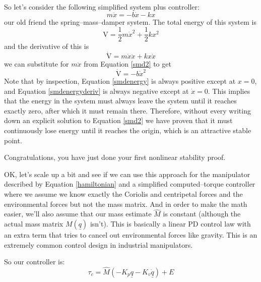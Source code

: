 \documentclass[]{article}
\begin{document}
So let's consider the following simplified system plus controller:
\begin{equation}
 m\ddot{x} = -b\dot{x} - kx \label{smd2}
\end{equation}
our old friend the spring--mass--damper system.
The total energy of this system is
\begin{equation}
 \mathrm{V} = \frac{1}{2}m\dot{x}^{2} + \frac{1}{2}kx^{2} \label{smdenergy}
\end{equation}
and the derivative of this is
\begin{displaymath}
 \dot{\mathrm{V}} = m\dot{x}\ddot{x}+kx\dot{x}
\end{displaymath}
we can substitute for $m\ddot{x}$ from Equation \ref{smd2} to get
\begin{equation}
 \dot{\mathrm{V}} = -b\dot{x}^{2} \label{smdenergyderiv}
\end{equation}
Note that by inspection, Equation \ref{smdenergy} is always positive except at $x=0$, and Equation \ref{smdenergyderiv} is always negative except at $\dot{x}=0$. This implies that the energy in the system must always leave the system until it reaches exactly zero, after which it must remain there. Therefore, without every writing down an explicit solution to Equation \ref{smd2} we have proven that it must continuously lose energy until it reaches the origin, which is an attractive stable point.

Congratulations, you have just done your first nonlinear stability proof.

OK, let's scale up a bit and see if we can use this approach for the manipulator described by Equation \ref{hamiltonian} and a simplified computed--torque controller where we assume we know exactly the Coriolis and centripetal forces and the environmental forces but not the mass matrix. And in order to make the math easier, we'll also assume that our mass estimate $\hat{M}$ is constant (although the actual mass matrix $M(\underline{q})$ isn't). This is basically a linear PD control law with an extra term that tries to cancel out environmental forces like gravity. This is an extremely common control design in industrial manipulators.

So our controller is:
\begin{equation}
\tau_{c} = \hat{M}\left(-K_{p}\underline{q} - K_{v}\dot{\underline{q}}\right) + E \label{simplect}
\end{equation}
\end{document}
